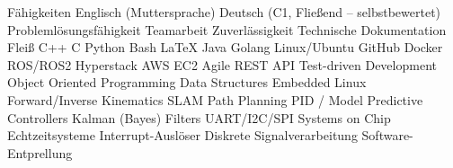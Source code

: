 
\begin{rubric}{Fähigkeiten}
\entry*[Sprachen]
	\skilldotfirst Englisch (Muttersprache) \skilldot Deutsch (C1, Fließend -- selbstbewertet)
\entry*[Stärken] 
	\skilldotfirst Problemlösungsfähigkeit \skilldot Teamarbeit \skilldot Zuverlässigkeit \newline \skilldotfirst Technische Dokumentation \skilldot Fleiß %
\entry*[Coding]
	\skilldotfirst C++ \skilldot C \skilldot Python \skilldot Bash  \skilldot LaTeX \skilldot Java \skilldot Golang
\entry*[Software] 
	\skilldotfirst Linux/Ubuntu \skilldot GitHub \skilldot Docker \skilldot ROS/ROS2 \newline \skilldotfirst Hyperstack \skilldot AWS EC2
\entry*[Wissen] 	
	\skilldotfirst Agile \skilldot REST API \skilldot Test-driven Development   \newline \skilldotfirst Object Oriented Programming \skilldot Data Structures \skilldot Embedded Linux
\entry*[Robotics]
	\skilldotfirst Forward/Inverse Kinematics \skilldot SLAM \skilldot Path Planning \newline \skilldotfirst PID / Model Predictive Controllers \skilldot Kalman (Bayes) Filters
\entry*[Mikrocontroller]
	\skilldotfirst UART/I2C/SPI \skilldot Systems on Chip \skilldot Echtzeitsysteme \newline \skilldotfirst Interrupt-Auslöser \skilldot Diskrete Signalverarbeitung \skilldot Software-Entprellung

\end{rubric}
